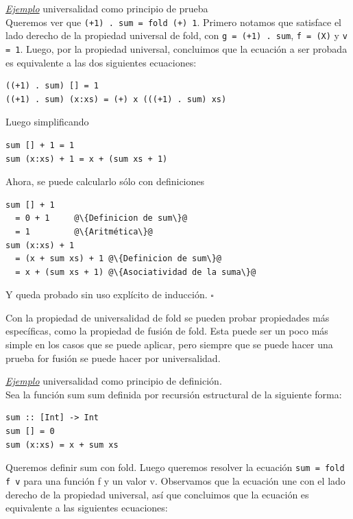 \documentclass[12pt]{extarticle}
\def\ejemplo{\textit{\underline{Ejemplo} }}
\newcommand\hsline[1]{\texttt{#1}}
\begin{document}
\ejemplo universalidad como principio de prueba \\
Queremos ver que \hsline{(+1) . sum = fold (+) 1}. Primero notamos que satisface el lado derecho de la propiedad universal de fold, con \hsline{g = (+1) . sum}, \hsline{f = (X)} y \hsline{v = 1}. Luego, por la propiedad universal, concluimos que la ecuación a ser probada es equivalente a las dos siguientes ecuaciones:

\begin{verbatim}
((+1) . sum) [] = 1
((+1) . sum) (x:xs) = (+) x (((+1) . sum) xs)
\end{verbatim}

Luego simplificando

\begin{verbatim}
sum [] + 1 = 1
sum (x:xs) + 1 = x + (sum xs + 1)
\end{verbatim}

Ahora, se puede calcularlo sólo con definiciones

\begin{verbatim}
sum [] + 1
  = 0 + 1     @\{Definicion de sum\}@
  = 1         @\{Aritmética\}@
sum (x:xs) + 1
  = (x + sum xs) + 1 @\{Definicion de sum\}@
  = x + (sum xs + 1) @\{Asociatividad de la suma\}@
\end{verbatim}

Y queda probado sin uso explícito de inducción. $\square$

Con la propiedad de universalidad de fold se pueden probar propiedades más específicas, como la propiedad de fusión de fold. Esta puede ser un poco más simple en los casos que se puede aplicar, pero siempre que se puede hacer una prueba for fusión se puede hacer por universalidad.

\ejemplo universalidad como principio de definición. \\
Sea la función sum sum definida por recursión estructural de la siguiente forma:

\begin{verbatim}
sum :: [Int] -> Int
sum [] = 0
sum (x:xs) = x + sum xs
\end{verbatim}

Queremos definir sum con fold. Luego queremos resolver la ecuación \hsline{sum = fold f v} para una función f y un valor v. Observamos que la ecuación une con el lado derecho de la propiedad universal, así que concluimos que la ecuación es equivalente a las siguientes ecuaciones:
\end{document}
